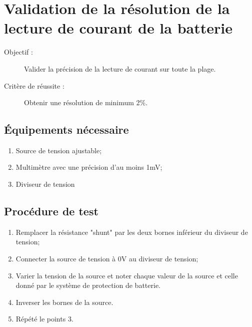 
\section{Validation de la résolution de la lecture de courant de la batterie}

	\begin{description}
		\item[Objectif :] Valider la précision de la lecture de courant sur toute la plage.
		\item[Critère de réussite :] Obtenir une résolution de minimum 2\%.
	\end{description}
	
	\subsection*{Équipements nécessaire}
	\begin{enumerate}
		\item Source de tension ajustable;
		\item Multimètre avec une précision d'au moins 1mV;
		\item Diviseur de tension
	\end{enumerate}	
	
	\subsection*{Procédure de test}
	\begin{enumerate}
		\item Remplacer la résistance "shunt" par les deux bornes inférieur du diviseur de tension; 
		\item Connecter la source de tension à 0V au diviseur de tension;
		\item Varier la tension de la source et noter chaque valeur de la source et celle donné par le système de protection de batterie.
		\item Inverser les bornes de la source.
		\item Répété le points 3.
	\end{enumerate}
